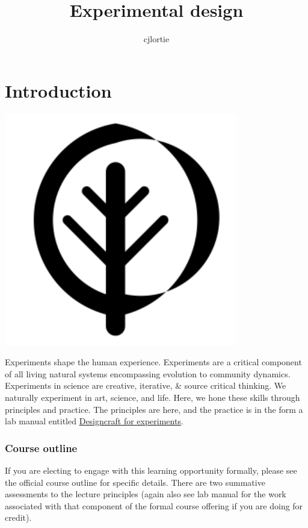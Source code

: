 \documentclass[
]{book}
\title{Experimental design}
\author{cjlortie}
\date{}
\begin{document}
\maketitle

{
\setcounter{tocdepth}{1}
\tableofcontents
}
\hypertarget{introduction}{%
\chapter*{Introduction}\label{introduction}}

\includegraphics[width=4in,height=\textheight]{./leaf.png}

Experiments shape the human experience. Experiments are a critical component of all living natural systems encompassing evolution to community dynamics. Experiments in science are creative, iterative, \& source critical thinking. We naturally experiment in art, science, and life. Here, we hone these skills through principles and practice. The principles are here, and the practice is in the form a lab manual entitled \href{https://bookdown.org/cj4nature/designcraft4experiments/}{Designcraft for experiments}.

\hypertarget{course-outline}{%
\subsection*{Course outline}\label{course-outline}}

If you are electing to engage with this learning opportunity formally, please see the official course outline for specific details. There are two summative assessments to the lecture principles (again also see lab manual for the work associated with that component of the formal course offering if you are doing for credit).
\end{document}
